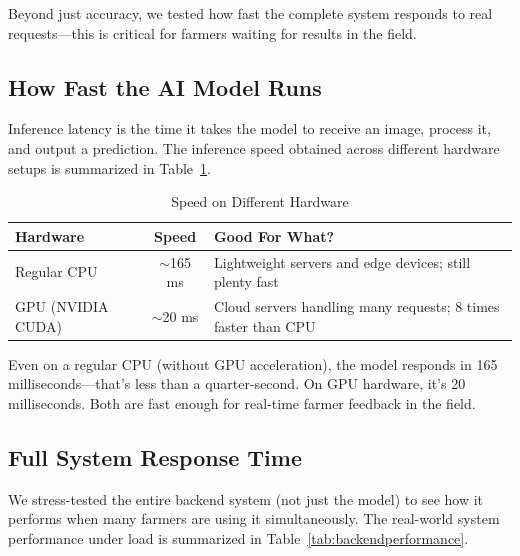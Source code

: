 Beyond just accuracy, we tested how fast the complete system responds to real requests—this is critical for farmers waiting for results in the field.

\subsection{How Fast the AI Model Runs}

Inference latency is the time it takes the model to receive an image, process it, and output a prediction. The inference speed obtained across different hardware setups is summarized in Table~\ref{tab:latency}.

\begin{table}[htbp]
  \centering
  \caption{Speed on Different Hardware}
  \label{tab:latency}
  \renewcommand{\arraystretch}{1.35}
  \begin{tabularx}{\textwidth}{@{} l c X @{}}
    \toprule
    \textbf{Hardware} & \textbf{Speed} & \textbf{Good For What?} \\
    \midrule
    Regular CPU & $\sim$165 ms & Lightweight servers and edge devices; still plenty fast \\
    \addlinespace
    GPU (NVIDIA CUDA) & $\sim$20 ms & Cloud servers handling many requests; 8 times faster than CPU \\
    \bottomrule
  \end{tabularx}
\end{table}

Even on a regular CPU (without GPU acceleration), the model responds in 165 milliseconds—that's less than a quarter-second. On GPU hardware, it's 20 milliseconds. Both are fast enough for real-time farmer feedback in the field.

\subsection{Full System Response Time}

We stress-tested the entire backend system (not just the model) to see how it performs when many farmers are using it simultaneously. The real-world system performance under load is summarized in Table~\ref{tab:backendperformance}.

